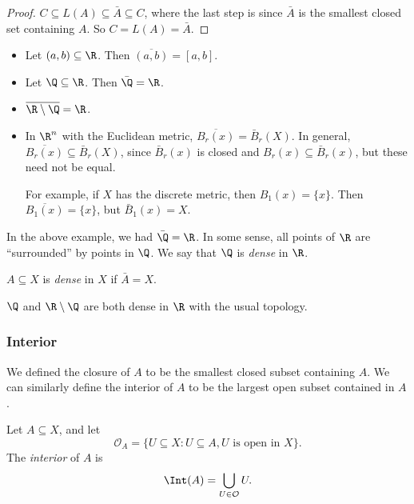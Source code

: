 \documentclass[a4paper]{article}
\begin{document}
\begin{proof}
  $C\subseteq L(A) \subseteq \bar A \subseteq C$, where the last step is since $\bar A$ is the smallest closed set containing $A$. So $C = L(A) = \bar A$.
\end{proof}

\begin{eg}\leavevmode
  \begin{itemize}
    \item Let $(a, b)\subseteq \R$. Then $\overline{(a, b)} = [a, b]$.
    \item Let $\Q\subseteq \R$. Then $\bar\Q = \R$.
    \item $\overline{\R \setminus \Q} = \R$.
    \item In $\R^n$ with the Euclidean metric, $\overline{B_r(x)} = \bar B_r(X)$. In general, $\overline{B_r(x)}\subseteq \bar B_r(X)$, since $\bar B_r(x)$ is closed and $B_r(x) \subseteq \bar B_r(x)$, but these need not be equal.

      For example, if $X$ has the discrete metric, then $B_1(x) = \{x\}$. Then $\overline{B_1(x)} = \{x\}$, but $\bar B_1(x) = X$.
  \end{itemize}
\end{eg}

In the above example, we had $\bar\Q = \R$. In some sense, all points of $\R$ are ``surrounded'' by points in $\Q$. We say that $\Q$ is \emph{dense} in $\R$.
\begin{defi}
  $A\subseteq X$ is \emph{dense} in $X$ if $\bar A = X$.
\end{defi}

\begin{eg}
  $\Q$ and $\R\setminus \Q$ are both dense in $\R$ with the usual topology.
\end{eg}

\subsubsection{Interior}
We defined the closure of $A$ to be the smallest closed subset containing $A$. We can similarly define the interior of $A$ to be the largest open subset contained in $A$.

\begin{defi}[Interior]
  Let $A\subseteq X$, and let
  \[
    \mathcal{O}_A = \{U\subseteq X: U\subseteq A, U\text{ is open in }X\}.
  \]
  The \emph{interior} of $A$ is
  \[
    \Int(A) = \bigcup_{U\in \mathcal{O}} U.
  \]
\end{defi}
\end{document}
